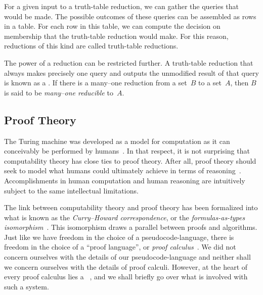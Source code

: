 For a given input to a truth-table reduction, we can gather the queries that would be made.
The possible outcomes of these queries can be assembled as rows in a table.
For each row in this table, we can compute the decision on membership that the truth-table reduction would make.
For this reason, reductions of this kind are called truth-table reductions.

The power of a reduction can be restricted further.
A truth-table reduction that always makes precisely one query and outputs the unmodified result of that query is known as a .
If there is a many--one reduction from a set~$B$ to a set~$A$, then $B$ is said to be \emph{many--one reducible} to~$A$.


\subsection{Proof Theory}

The Turing machine was developed as a model for computation as it can conceivably be performed by humans~\parencite[Section~9]{turing1937computable}.
In that respect, it is not surprising that computability theory has close ties to proof theory.
After all, proof theory should seek to model what humans could ultimately achieve in terms of reasoning~\parencite[Section~37]{kleene1967mathematical}.
Accomplishments in human computation and human reasoning are intuitively subject to the same intellectual limitations.

The link between computability theory and proof theory has been formalized into what is known as the \emph{Curry--Howard correspondence}, or the \emph{formulas-as-types isomorphism}~\parencite[Section~2.5]{troelstra2000basic}.
This isomorphism draws a parallel between proofs and algorithms.
Just like we have freedom in the choice of a pseudocode-language, there is freedom in the choice of a \enquote{proof language}, or \emph{proof calculus}~\parencite{kleene1967mathematical,troelstra2000basic}.
We did not concern ourselves with the details of our pseudocode-language and neither shall we concern ourselves with the details of proof calculi.
However, at the heart of every proof calculus lies a ~\parencite{kleene1967mathematical}, and we shall briefly go over what is involved with such a system.

